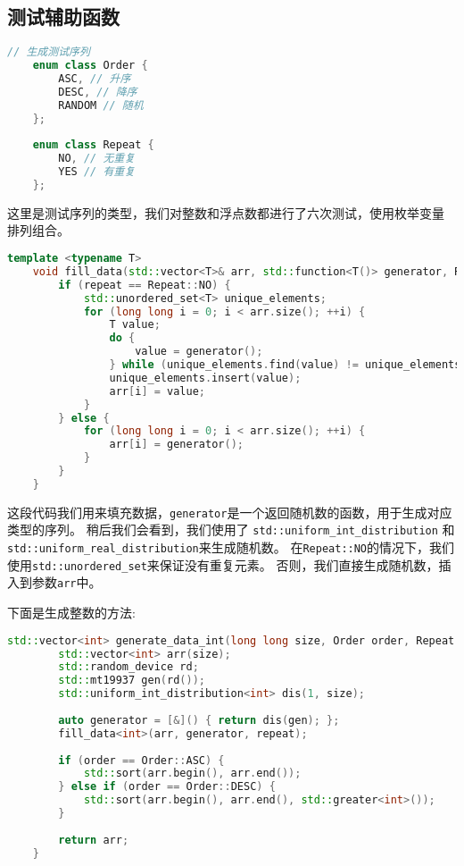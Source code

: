 \documentclass[UTF8]{ctexart}
\begin{document}
\subsection{测试辅助函数}

\begin{lstlisting}[language=C++]
    // 生成测试序列
    enum class Order {
        ASC, // 升序
        DESC, // 降序
        RANDOM // 随机
    };
    
    enum class Repeat {
        NO, // 无重复
        YES // 有重复
    };
\end{lstlisting}

这里是测试序列的类型，我们对整数和浮点数都进行了六次测试，使用枚举变量
排列组合。

\begin{lstlisting}[language=C++]
    template <typename T>
    void fill_data(std::vector<T>& arr, std::function<T()> generator, Repeat repeat) {
        if (repeat == Repeat::NO) {
            std::unordered_set<T> unique_elements;
            for (long long i = 0; i < arr.size(); ++i) {
                T value;
                do {
                    value = generator();
                } while (unique_elements.find(value) != unique_elements.end());
                unique_elements.insert(value);
                arr[i] = value;
            }
        } else {
            for (long long i = 0; i < arr.size(); ++i) {
                arr[i] = generator();
            }
        }
    }
\end{lstlisting}

这段代码我们用来填充数据，\texttt{generator}是一个返回随机数的函数，用于生成对应类型的序列。
稍后我们会看到，我们使用了
\texttt{std::uniform\_int\_distribution}
和\texttt{std::uniform\_real\_distribution}来生成随机数。
在\texttt{Repeat::NO}的情况下，我们使用\texttt{std::unordered\_set}来保证没有重复元素。
否则，我们直接生成随机数，插入到参数\texttt{arr}中。

下面是生成整数的方法:

\begin{lstlisting}[language=C++]
    std::vector<int> generate_data_int(long long size, Order order, Repeat repeat) {
        std::vector<int> arr(size);
        std::random_device rd;
        std::mt19937 gen(rd());
        std::uniform_int_distribution<int> dis(1, size);
    
        auto generator = [&]() { return dis(gen); };
        fill_data<int>(arr, generator, repeat);
    
        if (order == Order::ASC) {
            std::sort(arr.begin(), arr.end());
        } else if (order == Order::DESC) {
            std::sort(arr.begin(), arr.end(), std::greater<int>());
        }
    
        return arr;
    }
\end{lstlisting}
\end{document}
